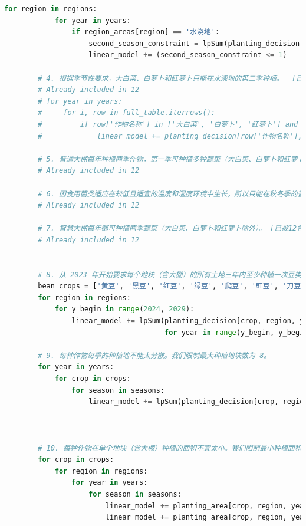 \documentclass{cumcmthesis}
\begin{document}
\begin{appendices}
\begin{lstlisting}[language=python]
        for region in regions:
            for year in years:
                if region_areas[region] == '水浇地':
                    second_season_constraint = lpSum(planting_decision[(crop, region, year, '第二季')] for crop in second_season_allowed_crops)
                    linear_model += (second_season_constraint <= 1)
    
        # 4. 根据季节性要求，大白菜、白萝卜和红萝卜只能在水浇地的第二季种植。  [已被12包含]
        # Already included in 12
        # for year in years:
        #     for i, row in full_table.iterrows():
        #         if row['作物名称'] in ['大白菜', '白萝卜', '红萝卜'] and row['地块类型'] == '水浇地':
        #             linear_model += planting_decision[row['作物名称'], row['种植地块'], year, '第一季'] == 0            
    
        # 5. 普通大棚每年种植两季作物，第一季可种植多种蔬菜（大白菜、白萝卜和红萝卜除外），第二季只能种植食用菌。[已被12包含]
        # Already included in 12
    
        # 6. 因食用菌类适应在较低且适宜的温度和湿度环境中生长，所以只能在秋冬季的普通大棚里种植。 [已被12包含]
        # Already included in 12
    
        # 7. 智慧大棚每年都可种植两季蔬菜（大白菜、白萝卜和红萝卜除外）。 [已被12包含]
        # Already included in 12
    
    
        # 8. 从 2023 年开始要求每个地块（含大棚）的所有土地三年内至少种植一次豆类作物。
        bean_crops = ['黄豆', '黑豆', '红豆', '绿豆', '爬豆', '豇豆', '刀豆', '芸豆']
        for region in regions:
            for y_begin in range(2024, 2029):
                linear_model += lpSum(planting_decision[crop, region, year, season] for crop in bean_crops 
                                      for year in range(y_begin, y_begin + 3) for season in seasons) >= 1
    
        # 9. 每种作物每季的种植地不能太分散。我们限制最大种植地块数为 8。
        for year in years:
            for crop in crops:
                for season in seasons:
                    linear_model += lpSum(planting_decision[crop, region, year, season] for region in regions) <= 8
    
    
    
        # 10. 每种作物在单个地块（含大棚）种植的面积不宜太小。我们限制最小种植面积为 30%。
        for crop in crops:
            for region in regions:
                for year in years:
                    for season in seasons:
                        linear_model += planting_area[crop, region, year, season] >= 0.3 * region_areas[region] * planting_decision[crop, region, year, season]
                        linear_model += planting_area[crop, region, year, season] <= region_areas[region] * planting_decision[crop, region, year, season]
    

\end{lstlisting}
\end{appendices}
\end{document}

